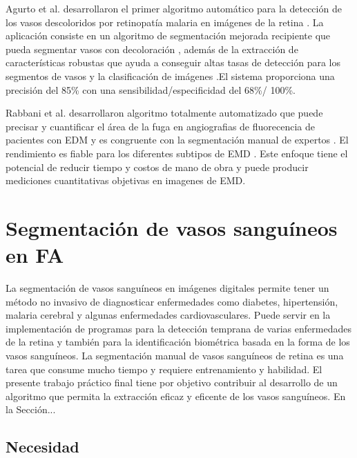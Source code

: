 Agurto et al. \cite{agurto2016vessel}  desarrollaron el primer algoritmo automático para la detección de los vasos descoloridos por retinopatía malaria en imágenes de la retina . La aplicación consiste en un algoritmo de segmentación mejorada recipiente que pueda segmentar vasos con decoloración , además de la extracción de características robustas que  ayuda a conseguir altas tasas de detección para los segmentos de vasos y la clasificación de imágenes .El sistema proporciona una precisión del 85\% con una sensibilidad/especificidad del 68\%/ 100\%. 

Rabbani et al. \cite{rabbani2015fully}  desarrollaron algoritmo totalmente automatizado que puede  precisar y cuantificar el área de la fuga en angiografias de fluorecencia de pacientes con EDM y es congruente con la segmentación manual de expertos . El rendimiento es fiable para los diferentes subtipos de EMD . Este enfoque tiene el potencial de reducir tiempo y costos de mano de obra y puede producir mediciones cuantitativas objetivas en imagenes de EMD.



 

\section{Segmentaci\'on de vasos sangu\'ineos en FA}
 
	La segmentación de vasos sanguíneos en imágenes digitales permite tener un método no invasivo de diagnosticar enfermedades como diabetes, hipertensión, malaria cerebral y algunas enfermedades cardiovasculares. Puede servir en la implementación de programas para la detección temprana de varias enfermedades de la retina y también para la identificación biométrica basada en la forma de los vasos sanguíneos. La segmentación manual de vasos sanguíneos de retina es una tarea que consume mucho tiempo y requiere entrenamiento y habilidad. \cite{cepeda2016segmentacion} 
	El presente trabajo pr\'actico final tiene por objetivo contribuir al desarrollo de un algoritmo que permita la extracci\'on eficaz y eficente de los vasos sangu\'ineos. En la Secci\'on...	
	
	\subsection{Necesidad}
	
